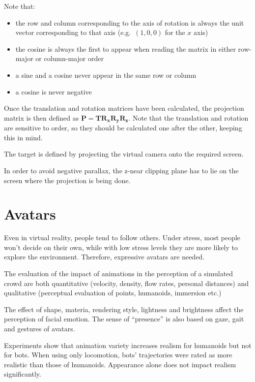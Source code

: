 \documentclass[a4paper]{article}
\begin{document}
Note that:

\begin{itemize}

\item
  the row and column corresponding to the axis of rotation is always the
  unit vector corresponding to that axis (e.g.~\((1, 0, 0)\) for the
  \(x\) axis)
\item
  the cosine is always the first to appear when reading the matrix in
  either row-major or column-major order
\item
  a sine and a cosine never appear in the same row or column
\item
  a cosine is never negative
\end{itemize}

Once the translation and rotation matrices have been calculated, the
projection matrix is then defined as
\(\mathbf{P} = \mathbf{T R_x R_y R_z}\). Note that the translation and
rotation are sensitive to order, so they should be calculated one after
the other, keeping this in mind.

The target is defined by projecting the virtual camera onto the required
screen.

In order to avoid negative parallax, the z-near clipping plane has to
lie on the screen where the projection is being done.


\section{Avatars}

Even in virtual reality, people tend to follow others. Under stress,
most people won't decide on their own, while with low stress levels they
are more likely to explore the environment. Therefore, expressive
avatars are needed.

The evaluation of the impact of animations in the perception of a
simulated crowd are both quantitative (velocity, density, flow rates,
personal distances) and qualitative (perceptual evaluation of points,
humanoids, immersion etc.)

The effect of shape, materia, rendering style, lightness and brightness
affect the perception of facial emotion. The sense of ``presence'' is
also based on gaze, gait and gestures of avatars.

Experiments show that animation variety increases realism for humanoids
but not for bots. When using only locomotion, bots' trajectories were
rated as more realistic than those of humanoids. Appearance alone does
not impact realism significantly.
\end{document}
